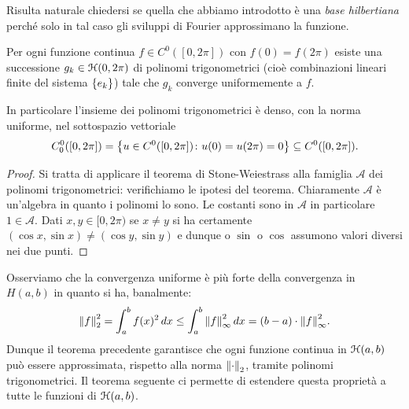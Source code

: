 Risulta naturale chiedersi se quella che abbiamo introdotto è una
\emph{base hilbertiana} perché solo in tal caso gli sviluppi di Fourier
approssimano la funzione.

\begin{theorem}
Per ogni funzione continua $f\in C^0([0,2\pi])$
con $f(0)=f(2\pi)$ esiste una successione $g_k\in \mathcal H(0,2\pi)$ 
di polinomi trigonometrici
(cioè combinazioni lineari finite del sistema ${\left\{ e_k \right\}}$)
tale che $g_k$ converge uniformemente a $f$.

In particolare l'insieme dei polinomi trigonometrici
è denso, con la norma uniforme,
nel sottospazio vettoriale
\[
  C^0_0([0,2\pi]) 
  = {\left\{ u\in C^0([0,2\pi])\colon u(0)=u(2\pi)=0 \right\}}
  \subseteq C^0([0,2\pi]).
\]
\end{theorem}
%
\begin{proof}
Si tratta di applicare il teorema di Stone-Weiestrass 
alla famiglia $\mathcal A$ dei polinomi trigonometrici:
verifichiamo le ipotesi del teorema.
Chiaramente $\mathcal A$ è un'algebra in quanto i polinomi 
lo sono.
Le costanti sono in $\mathcal A$ in particolare $1\in \mathcal A$.
Dati $x,y \in [0,2\pi)$ se $x\neq y$ 
si ha certamente $(\cos x, \sin x) \neq (\cos y, \sin y)$
e dunque o $\sin$ o $\cos$ assumono valori diversi nei due punti.
\end{proof}

Osserviamo che la convergenza uniforme è più forte della convergenza
in $H(a,b)$ in quanto si ha, banalmente:
\[
  {\left\Vert f\right\Vert}_2^2 = \int_a^b f(x)^2\, dx
  \le \int_a^b {\left\Vert f\right\Vert}_\infty^2\, dx
  = (b-a) \cdot {\left\Vert f\right\Vert}_\infty^2.
\]
Dunque il teorema precedente garantisce che ogni funzione continua
in $\mathcal H(a,b)$ può essere approssimata, rispetto alla norma ${\left\Vert \cdot\right\Vert}_2$,
tramite polinomi trigonometrici. Il teorema seguente ci permette
di estendere questa proprietà a tutte le funzioni di $\mathcal H(a,b)$.

